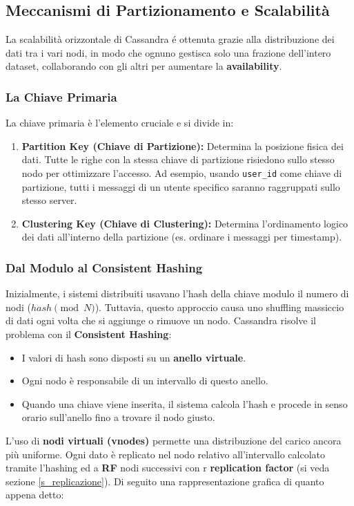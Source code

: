 \documentclass[12pt]{article}
\begin{document}
\subsection{Meccanismi di Partizionamento e Scalabilità}
La scalabilità orizzontale di Cassandra é ottenuta grazie alla distribuzione dei dati tra i vari nodi, in modo che ognuno gestisca solo una frazione dell'intero dataset, collaborando con gli altri per aumentare la \textbf{availability}.

\subsubsection{La Chiave Primaria} \label{s_primary_key}
La chiave primaria è l'elemento cruciale e si divide in:
\begin{enumerate}
    \item \textbf{Partition Key (Chiave di Partizione):} Determina la posizione fisica dei dati. Tutte le righe con la stessa chiave di partizione risiedono sullo stesso nodo per ottimizzare l'accesso. Ad esempio, usando \texttt{user\_id} come chiave di partizione, tutti i messaggi di un utente specifico saranno raggruppati sullo stesso server.
    \item \textbf{Clustering Key (Chiave di Clustering):} Determina l'ordinamento logico dei dati all'interno della partizione (es. ordinare i messaggi per timestamp).
\end{enumerate}

\subsubsection{Dal Modulo al Consistent Hashing} \label{s_replicationFactor}
Inizialmente, i sistemi distribuiti usavano l'hash della chiave modulo il numero di nodi ($hash \pmod N$). Tuttavia, questo approccio causa uno shuffling massiccio di dati ogni volta che si aggiunge o rimuove un nodo. 
Cassandra risolve il problema con il \textbf{Consistent Hashing}:
\begin{itemize}
    \item I valori di hash sono disposti su un \textbf{anello virtuale}.
    \item Ogni nodo è responsabile di un intervallo di questo anello.
    \item Quando una chiave viene inserita, il sistema calcola l'hash e procede in senso orario sull'anello fino a trovare il nodo giusto.
\end{itemize}

\noindent
L'uso di \textbf{nodi virtuali (vnodes)} permette una distribuzione del carico ancora più uniforme.\newline
Ogni dato è replicato nel nodo relativo all'intervallo calcolato tramite l'hashing ed a \textbf{RF} nodi successivi con r \textbf{replication factor} (si veda sezione \ref{s_replicazione}).
\newline \newline
\noindent
Di seguito una rappresentazione grafica di quanto appena detto:
\end{document}
